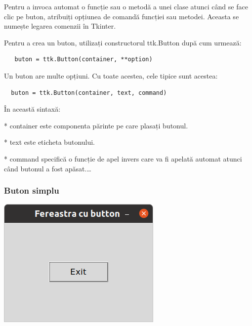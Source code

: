 \documentclass[12pt,a4paper]{book}
\begin{document}
Pentru a invoca automat o funcție sau o metodă a unei clase atunci când se face clic pe buton, atribuiți opțiunea de comandă funcției sau metodei.  Aceasta se numește legarea comenzii în Tkinter.

Pentru a crea un buton, utilizați constructorul ttk.Button după cum urmează:
\begin{verbatim}
   buton = ttk.Button(container, **option)
\end{verbatim}
Un buton are multe opțiuni.  Cu toate acestea, cele tipice sunt acestea:
\begin{verbatim}
  buton = ttk.Button(container, text, command)
\end{verbatim}
În această sintaxă:

     * container este componenta părinte pe care plasați butonul.
     
     * text este eticheta butonului.
     
     * command specifică o funcție de apel invers care va fi apelată automat atunci când butonul a fost apăsat.\ldots
\subsubsection{Buton simplu}

\includegraphics[width=\linewidth]{img03.png}

\end{document}

